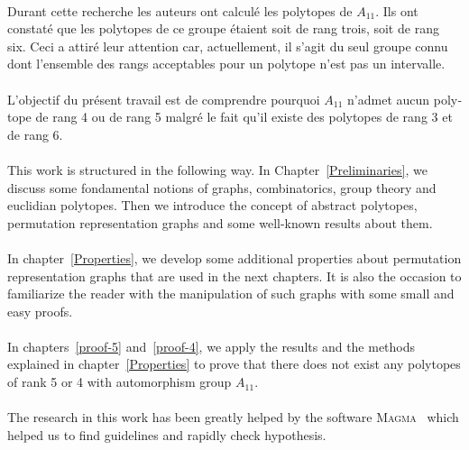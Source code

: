 \begin{otherlanguage}{french}
\paragraph{}
Durant cette recherche les auteurs ont calculé les polytopes de $A_{11}$. Ils ont constaté que les polytopes de ce groupe étaient soit de rang trois, soit de rang six. Ceci a attiré leur attention car, actuellement, il s'agit du seul groupe connu dont l'ensemble des rangs acceptables pour un polytope n'est pas un intervalle.

\paragraph{}
L'objectif du présent travail est de comprendre pourquoi $A_{11}$ n'admet aucun polytope de rang 4 ou de rang 5 malgré le fait qu'il existe des polytopes de rang 3 et de rang 6.

\end{otherlanguage}

\paragraph{}
This work is structured in the following way. In Chapter~\ref{Preliminaries}, we discuss some fondamental notions of graphs, combinatorics, group theory and euclidian polytopes. Then we introduce the concept of abstract polytopes, permutation representation graphs and some well-known results about them.

\paragraph{}
In chapter~\ref{Properties}, we develop some additional properties about permutation representation graphs that are used in the next chapters. It is also the occasion to familiarize the reader with the manipulation of such graphs with some small and easy proofs.

\paragraph{}
In chapters~\ref{proof-5} and~\ref{proof-4}, we apply the results and the methods explained in chapter~\ref{Properties} to prove that there does not exist any polytopes of rank 5 or 4 with automorphism group $A_{11}$.

\paragraph{}
The research in this work has been greatly helped by the software \textsc{Magma}~\cite{magma} which helped us to find guidelines and rapidly check hypothesis.
